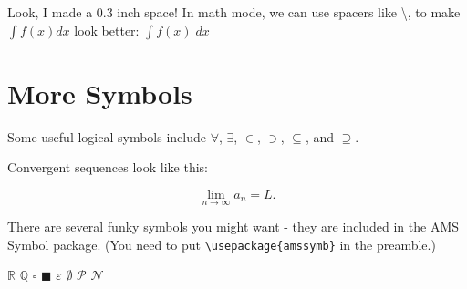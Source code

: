 \documentclass{article}  %
\newcommand{\ds}{\displaystyle}
\newcommand{\e}{\varepsilon}
\begin{document}
\vspace{0.3in}

\noindent
Look, I made a $0.3$ inch space!  In math mode, we can use spacers like \textbackslash , to make $\ds \int f(x) dx$ look better: $\ds \int f(x)\; dx$

\section{More Symbols}

Some useful logical symbols include $\forall$,  $\exists$, $\in$,  $\ni$, $\subseteq$, and $\supseteq$.

Convergent sequences look like this:

\[
\lim_{n \to \infty} a_n = L.
\]

There are several funky symbols you might want - they are included in the AMS Symbol package.  (You need to put  \verb#\usepackage{amssymb}# in the preamble.)

${\mathbb R}$ %
\qquad ${\mathbb Q}$ \qquad $\square$ \qquad$\blacksquare$ \qquad $\e$ \qquad $\emptyset$ \qquad $\mathcal P$ \qquad $\mathcal N$
\end{document}
